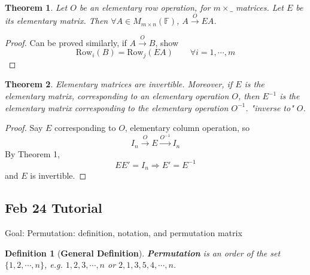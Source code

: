 \documentclass[12pt]{article}
\theoremstyle{plain}
\newtheorem{theorem}{Theorem}[subsection]
\newtheorem{definition}{Definition}[subsection]
\newcommand{\Row}{\mathrm{Row}}
\newcommand{\mF}{{\mathbb{F}}}
\begin{document}
	\begin{theorem}
		Let $O$ be an elementary row operation, for $m \times \_$ matrices.
		Let $E$ be its elementary matrix. Then
		$\forall A \in M_{m \times n}(\mF)$, $A \overset{O}{\longrightarrow}EA$. 
	\end{theorem}
	\begin{proof}
		Can be proved similarly, if $A \overset{O}{\longrightarrow }B$, 
		show
		\[
			\Row _i(B) = \Row_j(EA) \qquad \forall i = 1, \cdots, m
		\]
	\end{proof}

	\begin{theorem}
		Elementary matrices are invertible. Moreover, if $E$ is the elementary
		matrix, corresponding to an elementary operation $O$, then $E^{-1}$ is 
		the elementary matrix corresponding to the elementary operation $O^{-1}$.
		"inverse to" $O$. 
	\end{theorem}
	\begin{proof}
		Say $E$ corresponding to $O$, elementary column operation, so 
		\[
			I_n \overset{O}{\longrightarrow} E 
			\overset{O^{-1}}{\longrightarrow}I_n  
		\]
		By Theorem 1, 
		\[
			E E' = I_n \Rightarrow E' = E^{-1} 
		\]
		and $E$ is invertible. 
	\end{proof}





\newpage
\subsection{Feb 24 Tutorial}

Goal: Permutation: definition, notation, and permutation matrix

\begin{definition}[\textbf{General Definition}]
	\textbf{Permutation} is an order of the set $\{1, 2, \cdots, n\}$,
		e.g. $1, 2, 3, \cdots, n$ or $2, 1, 3, 5, 4, \cdots, n$. 
\end{definition}
\end{document}
